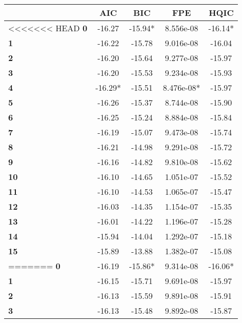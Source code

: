 \begin{center}
\begin{tabular}{lcccc}
\toprule
            & \textbf{AIC} & \textbf{BIC} & \textbf{FPE} & \textbf{HQIC}  \\
\midrule
<<<<<<< HEAD
\textbf{0}  &      -16.27  &     -15.94*  &   8.556e-08  &      -16.14*   \\
\textbf{1}  &      -16.22  &      -15.78  &   9.016e-08  &       -16.04   \\
\textbf{2}  &      -16.20  &      -15.64  &   9.277e-08  &       -15.97   \\
\textbf{3}  &      -16.20  &      -15.53  &   9.234e-08  &       -15.93   \\
\textbf{4}  &     -16.29*  &      -15.51  &  8.476e-08*  &       -15.97   \\
\textbf{5}  &      -16.26  &      -15.37  &   8.744e-08  &       -15.90   \\
\textbf{6}  &      -16.25  &      -15.24  &   8.884e-08  &       -15.84   \\
\textbf{7}  &      -16.19  &      -15.07  &   9.473e-08  &       -15.74   \\
\textbf{8}  &      -16.21  &      -14.98  &   9.291e-08  &       -15.72   \\
\textbf{9}  &      -16.16  &      -14.82  &   9.810e-08  &       -15.62   \\
\textbf{10} &      -16.10  &      -14.65  &   1.051e-07  &       -15.52   \\
\textbf{11} &      -16.10  &      -14.53  &   1.065e-07  &       -15.47   \\
\textbf{12} &      -16.03  &      -14.35  &   1.154e-07  &       -15.35   \\
\textbf{13} &      -16.01  &      -14.22  &   1.196e-07  &       -15.28   \\
\textbf{14} &      -15.94  &      -14.04  &   1.292e-07  &       -15.18   \\
\textbf{15} &      -15.89  &      -13.88  &   1.382e-07  &       -15.08   \\
=======
\textbf{0}  &      -16.19  &     -15.86*  &   9.314e-08  &      -16.06*   \\
\textbf{1}  &      -16.15  &      -15.71  &   9.691e-08  &       -15.97   \\
\textbf{2}  &      -16.13  &      -15.59  &   9.891e-08  &       -15.91   \\
\textbf{3}  &      -16.13  &      -15.48  &   9.892e-08  &       -15.87   \\

\end{tabular}
\end{center}
